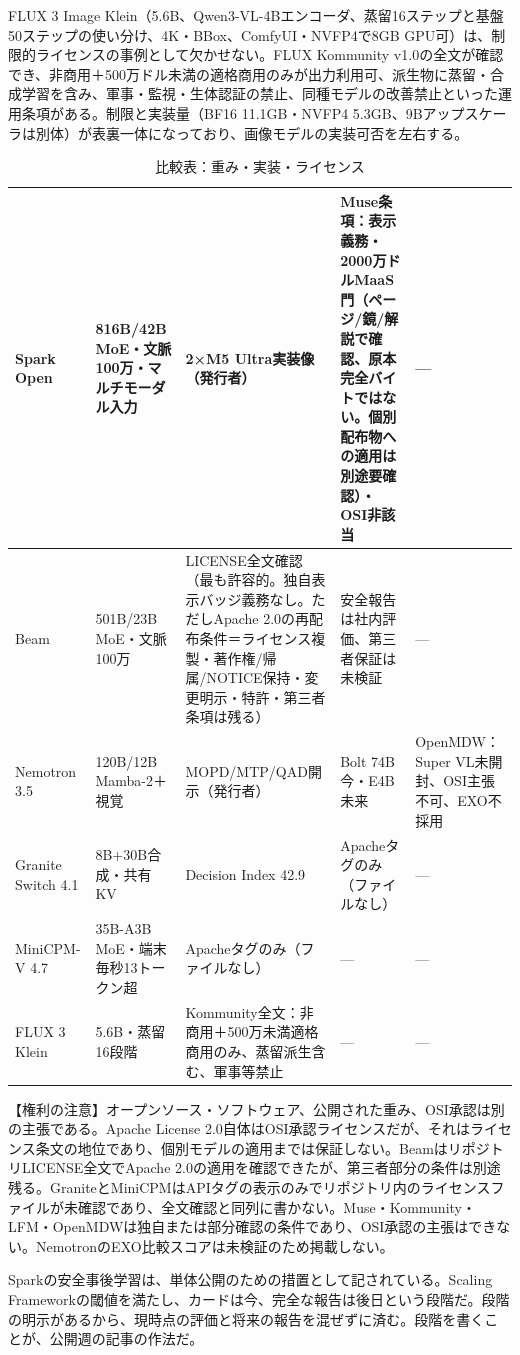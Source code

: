 \documentclass[lualatex,a4paper,10pt]{jlreq}
\begin{document}
FLUX 3 Image Klein（5.6B、Qwen3-VL-4Bエンコーダ、蒸留16ステップと基盤50ステップの使い分け、4K・BBox、ComfyUI・NVFP4で8GB GPU可）は、制限的ライセンスの事例として欠かせない。FLUX Kommunity v1.0の全文が確認でき、非商用＋500万ドル未満の適格商用のみが出力利用可、派生物に蒸留・合成学習を含み、軍事・監視・生体認証の禁止、同種モデルの改善禁止といった運用条項がある。制限と実装量（BF16 11.1GB・NVFP4 5.3GB、9Bアップスケーラは別体）が表裏一体になっており、画像モデルの実装可否を左右する。

\begin{table}[htbp]\centering\footnotesize
\caption{比較表：重み・実装・ライセンス}
\begin{tabularx}{0.96\linewidth}{@{}lXXXX@{}}
\toprule
Spark Open & 816B/42B MoE・文脈100万・マルチモーダル入力 & 2×M5 Ultra実装像（発行者） & Muse条項：表示義務・2000万ドルMaaS門（ページ/鏡/解説で確認、原本完全バイトではない。個別配布物への適用は別途要確認）・OSI非該当 & --- \\
\midrule
Beam & 501B/23B MoE・文脈100万 & LICENSE全文確認（最も許容的。独自表示バッジ義務なし。ただしApache 2.0の再配布条件＝ライセンス複製・著作権/帰属/NOTICE保持・変更明示・特許・第三者条項は残る） & 安全報告は社内評価、第三者保証は未検証 & --- \\
\midrule
Nemotron 3.5 & 120B/12B Mamba-2＋視覚 & MOPD/MTP/QAD開示（発行者） & Bolt 74B今・E4B未来 & OpenMDW：Super VL未開封、OSI主張不可、EXO不採用 \\
\midrule
Granite Switch 4.1 & 8B+30B合成・共有KV & Decision Index 42.9 & Apacheタグのみ（ファイルなし） & --- \\
\midrule
MiniCPM-V 4.7 & 35B-A3B MoE・端末毎秒13トークン超 & Apacheタグのみ（ファイルなし） & --- & --- \\
\midrule
FLUX 3 Klein & 5.6B・蒸留16段階 & Kommunity全文：非商用＋500万未満適格商用のみ、蒸留派生含む、軍事等禁止 & --- & --- \\
\bottomrule
\end{tabularx}
\end{table}
\begin{tcolorbox}[colback=SurveySoft,colframe=SurveyRule,arc=1mm,boxrule=0.4pt,left=2mm,right=2mm]
【権利の注意】オープンソース・ソフトウェア、公開された重み、OSI承認は別の主張である。Apache License 2.0自体はOSI承認ライセンスだが、それはライセンス条文の地位であり、個別モデルの適用までは保証しない。BeamはリポジトリLICENSE全文でApache 2.0の適用を確認できたが、第三者部分の条件は別途残る。GraniteとMiniCPMはAPIタグの表示のみでリポジトリ内のライセンスファイルが未確認であり、全文確認と同列に書かない。Muse・Kommunity・LFM・OpenMDWは独自または部分確認の条件であり、OSI承認の主張はできない。NemotronのEXO比較スコアは未検証のため掲載しない。
\end{tcolorbox}
Sparkの安全事後学習は、単体公開のための措置として記されている。Scaling Frameworkの閾値を満たし、カードは今、完全な報告は後日という段階だ。段階の明示があるから、現時点の評価と将来の報告を混ぜずに済む。段階を書くことが、公開週の記事の作法だ。
\end{document}

